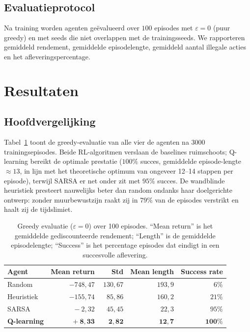 \documentclass[11pt,a4paper]{article}
\begin{document}
\subsection{Evaluatieprotocol}

Na training worden agenten ge\"evalueerd over $100$ episodes met
$\varepsilon = 0$ (puur greedy) en met seeds die niet overlappen met de
trainingsseeds. We rapporteren gemiddeld rendement, gemiddelde
episodelengte, gemiddeld aantal illegale acties en het
afleveringspercentage.

\section{Resultaten}
\label{sec:results}

\subsection{Hoofdvergelijking}

Tabel~\ref{tab:main} toont de greedy-evaluatie van alle vier de agenten
na 3000 trainings\-episodes. Beide RL-algoritmen verslaan de baselines
ruimschoots; Q-learning bereikt de optimale prestatie ($100\%$ succes,
gemiddelde episode-lengte $\approx 13$, in lijn met het theoretische
optimum van ongeveer 12--14 stappen per episode), terwijl SARSA er net
onder zit met $95\%$ succes. De wandblinde heuristiek presteert
nauwelijks beter dan random ondanks haar doelgerichte ontwerp: zonder
muur\-bewustzijn raakt zij in 79\% van de episodes verstrikt en haalt
zij de tijdslimiet.

\begin{table}[h]
\centering
\caption{Greedy evaluatie ($\varepsilon=0$) over 100 episodes.
``Mean return'' is het gemiddelde gediscounteerde rendement;
``Length'' is de gemiddelde episodelengte;
``Success'' is het percentage episodes dat eindigt in een succesvolle
aflevering.}
\label{tab:main}
\begin{tabular}{lrrrr}
\toprule
Agent & Mean return & Std & Mean length & Success rate \\
\midrule
Random            & $-748{,}47$ & $130{,}67$ & $193{,}9$ & $\phantom{0}6\%$ \\
Heuristiek        & $-155{,}74$ & $\phantom{0}85{,}86$ & $160{,}2$ & $21\%$ \\
SARSA             & $\phantom{-00}-2{,}32$ & $\phantom{0}45{,}45$ & $\phantom{0}22{,}3$ & $95\%$ \\
\textbf{Q-learning} & $\phantom{-00}+\mathbf{8{,}33}$ & $\phantom{00}\mathbf{2{,}82}$ & $\phantom{0}\mathbf{12{,}7}$ & $\mathbf{100\%}$ \\
\bottomrule
\end{tabular}
\end{table}
\end{document}
